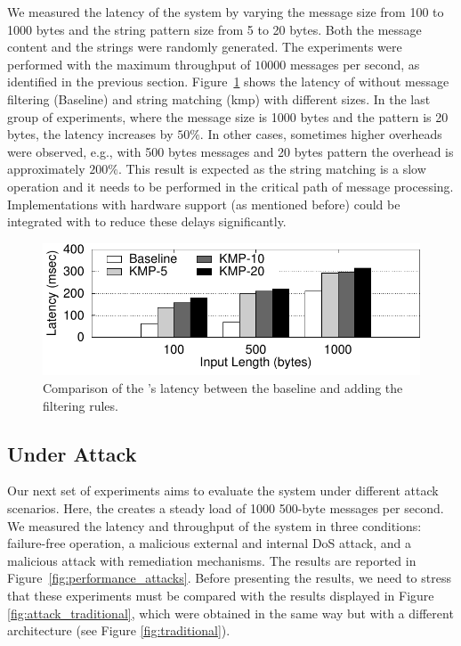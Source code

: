 We measured the latency of the system by varying the message size from 100 to 1000 bytes and the string pattern size from 5 to 20 bytes. 
Both the message content and the strings were randomly generated. 
The experiments were performed with the maximum throughput of $10 000$ messages per second, as identified in the previous section. 
Figure~\ref{fig:KMP} shows the latency of \sieveq without message filtering (Baseline) and string matching (\gls{kmp}) with different sizes.
In the last group of experiments, where the message size is 1000 bytes and the pattern is 20 bytes, the latency increases by $50\%$. 
In other cases, sometimes higher overheads were observed, e.g., with 500 bytes messages and 20 bytes pattern the overhead is approximately $200\%$. 
This result is expected as the string matching is a slow operation and it needs to be performed in the critical path of message processing. 
Implementations with hardware support (as mentioned before) could be integrated with \sieveq to reduce these delays significantly.

\begin{figure}[!t]
\centering
\includegraphics[width=\columnwidth]{images/gnuplot/sieveq/new_plot_fw/fw.pdf}
\caption{\small Comparison of the \sieveq's latency between the baseline and adding the filtering rules.}
\label{fig:KMP}
\end{figure}


\subsection{\sieveq Under Attack}

Our next set of experiments aims to evaluate the system under different attack scenarios.
Here, the \sender creates a steady load of 1000 500-byte messages per second.
We measured the latency and throughput of the system in three conditions: failure-free operation, a malicious external and internal DoS attack, and a malicious attack with remediation mechanisms.
The results are reported in Figure~\ref{fig:performance_attacks}.
Before presenting the results, we need to stress that these experiments must be compared with the results displayed in Figure \ref{fig:attack_traditional}, which were obtained in the same way but with a different architecture (see Figure \ref{fig:traditional}).

